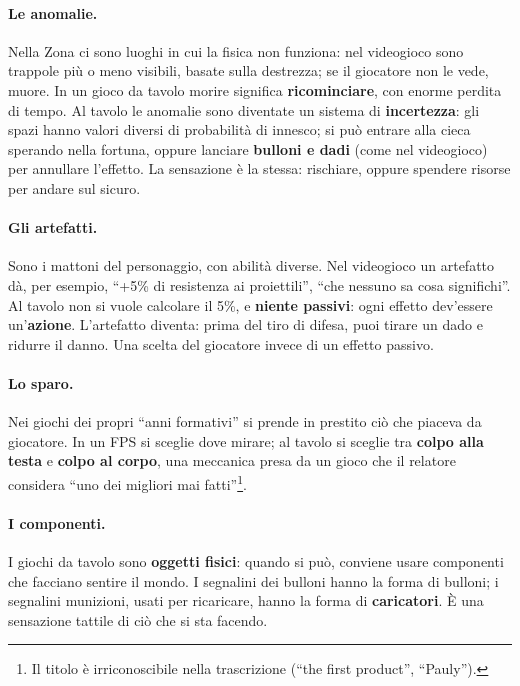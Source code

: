 \paragraph{Le anomalie.} Nella Zona ci sono luoghi in cui la fisica non funziona:
nel videogioco sono trappole più o meno visibili, basate sulla destrezza; se il
giocatore non le vede, muore. In un gioco da tavolo morire significa
\textbf{ricominciare}, con enorme perdita di tempo. Al tavolo le anomalie sono
diventate un sistema di \textbf{incertezza}: gli spazi hanno valori diversi di
probabilità di innesco; si può entrare alla cieca sperando nella fortuna, oppure
lanciare \textbf{bulloni e dadi} (come nel videogioco) per annullare l'effetto. La
sensazione è la stessa: rischiare, oppure spendere risorse per andare sul sicuro.

\paragraph{Gli artefatti.} Sono i mattoni del personaggio, con abilità diverse. Nel
videogioco un artefatto dà, per esempio, ``+5\% di resistenza ai proiettili'',
``che nessuno sa cosa significhi''. Al tavolo non si vuole calcolare il 5\%, e
\textbf{niente passivi}: ogni effetto dev'essere un'\textbf{azione}. L'artefatto
diventa: prima del tiro di difesa, puoi tirare un dado e ridurre il danno. Una
scelta del giocatore invece di un effetto passivo.

\paragraph{Lo sparo.} Nei giochi dei propri ``anni formativi'' si prende in
prestito ciò che piaceva da giocatore. In un FPS si sceglie dove mirare; al tavolo
si sceglie tra \textbf{colpo alla testa} e \textbf{colpo al corpo}, una meccanica
presa da un gioco che il relatore considera ``uno dei migliori mai fatti''\footnote{Il
titolo è irriconoscibile nella trascrizione (``the first product'', ``Pauly'').}.

\paragraph{I componenti.} I giochi da tavolo sono \textbf{oggetti fisici}: quando si
può, conviene usare componenti che facciano sentire il mondo. I segnalini dei
bulloni hanno la forma di bulloni; i segnalini munizioni, usati per ricaricare, hanno
la forma di \textbf{caricatori}. È una sensazione tattile di ciò che si sta facendo.

